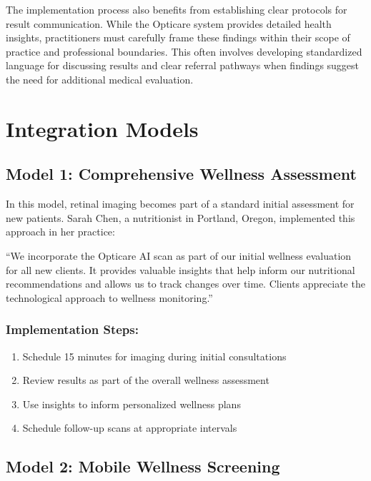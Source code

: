 \documentclass[
  Letterpaper,
]{scrbook}
\providecommand{\tightlist}{%
  \setlength{\itemsep}{0pt}\setlength{\parskip}{0pt}}\usepackage{longtable,booktabs,array}
\begin{document}
The implementation process also benefits from establishing clear
protocols for result communication. While the Opticare system provides
detailed health insights, practitioners must carefully frame these
findings within their scope of practice and professional boundaries.
This often involves developing standardized language for discussing
results and clear referral pathways when findings suggest the need for
additional medical evaluation.

\section{Integration Models}\label{integration-models}

\subsection{Model 1: Comprehensive Wellness
Assessment}\label{model-1-comprehensive-wellness-assessment}

In this model, retinal imaging becomes part of a standard initial
assessment for new patients. Sarah Chen, a nutritionist in Portland,
Oregon, implemented this approach in her practice:

``We incorporate the Opticare AI scan as part of our initial wellness
evaluation for all new clients. It provides valuable insights that help
inform our nutritional recommendations and allows us to track changes
over time. Clients appreciate the technological approach to wellness
monitoring.''

\subsubsection{Implementation Steps:}\label{implementation-steps}

\begin{enumerate}
\def\labelenumi{\arabic{enumi}.}
\tightlist
\item
  Schedule 15 minutes for imaging during initial consultations
\item
  Review results as part of the overall wellness assessment
\item
  Use insights to inform personalized wellness plans
\item
  Schedule follow-up scans at appropriate intervals
\end{enumerate}

\subsection{Model 2: Mobile Wellness
Screening}\label{model-2-mobile-wellness-screening}
\end{document}
